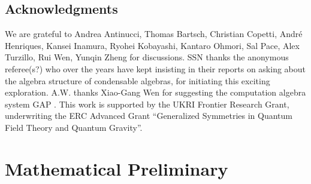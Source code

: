 \documentclass[aps,twocolumn,prx,floatfix,preprintnumbers, nofootinbib,10pt]{revtex4-2}
\numberwithin{equation}{section}
\theoremstyle{definition}
\begin{document}
\subsection*{Acknowledgments}
We are grateful to Andrea Antinucci, Thomas Bartsch, Christian Copetti, Andr\'{e} Henriques, Kansei Inamura, Ryohei Kobayashi, Kantaro Ohmori, Sal Pace, Alex Turzillo,  Rui Wen, Yunqin Zheng   for discussions. 
SSN thanks the anonymous referee(s?) who over the years have kept insisting in their reports on asking about the algebra structure of condensable algebras, for initiating this exciting exploration. 
A.W. thanks Xiao-Gang Wen for suggesting the computation algebra system GAP \cite{GAP4}. This work is supported by the UKRI Frontier Research Grant, underwriting the ERC Advanced Grant ``Generalized Symmetries in Quantum Field Theory and Quantum Gravity''.





\appendix

\section{Mathematical Preliminary}
\label{append:math-details}
\end{document}
